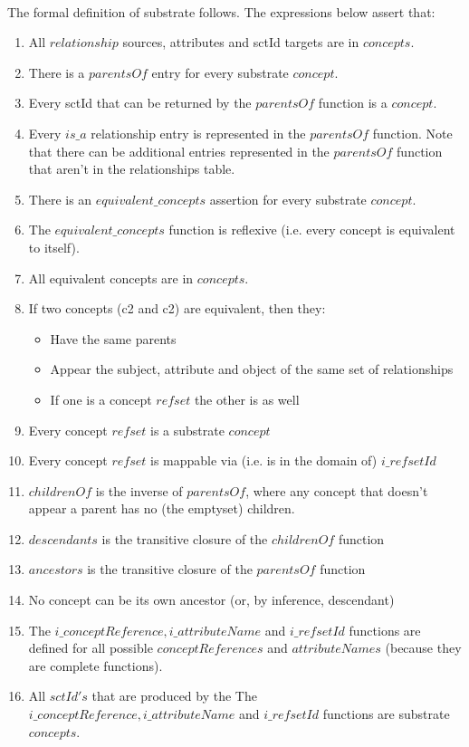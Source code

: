 \documentclass{article}
\begin{document}
\paragraph{}
The formal definition of substrate follows. The expressions below assert that:
\begin{enumerate}
\item All $relationship$ sources, attributes and sctId targets are in $concepts$.
\item There is a $parentsOf$ entry for every substrate $concept$.
\item Every sctId that can be returned by the $parentsOf$ function is a $concept$.
\item Every $is\_a$ relationship entry is represented in the $parentsOf$ function. Note that there can be additional entries represented in the $parentsOf$ function that aren't in the relationships table.
\item There is an $equivalent\_concepts$ assertion for every substrate $concept$.
\item The $equivalent\_concepts$ function is reflexive (i.e. every concept is equivalent to itself).
\item All equivalent concepts are in $concepts$.
\item If two concepts (c2 and c2) are equivalent, then they:
\begin{itemize}[noitemsep,nolistsep]
\item Have the same parents
\item Appear the subject, attribute and object of the same set of relationships
\item If one is a concept $refset$ the other is as well
\end{itemize}
\item Every concept $refset$ is a substrate $concept$
\item Every concept $refset$ is mappable via (i.e. is in the domain of)  $i\_refsetId$ 
\item $childrenOf$ is the inverse of $parentsOf$, where any concept that doesn't appear a parent has no (the emptyset) children.
\item $descendants$ is the transitive closure of the $childrenOf$ function
\item $ancestors$ is the transitive closure of the $parentsOf$ function
\item No concept can be its own ancestor (or, by inference, descendant)
\item The $i\_conceptReference, i\_attributeName$ and $i\_refsetId$ functions are defined for all possible $conceptReferences$ and $attributeNames$ (because they are complete functions).
\item All $sctId's$ that are produced by the The $i\_conceptReference, i\_attributeName$ and $i\_refsetId$ functions are substrate $concepts$.
\end{enumerate}
\end{document}
